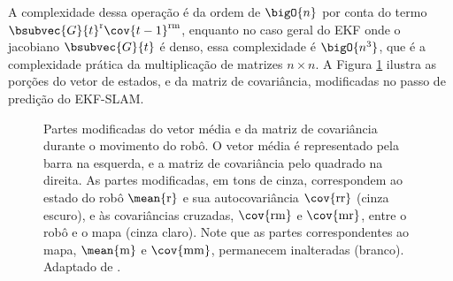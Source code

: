 \renewcommand{\arraystretch}{1.0}
A complexidade dessa operação é da ordem de $\bigO{n}$ por conta do termo $\bsubvec{G}{t}^\mathrm{r} \cov{t-1}^\mathrm{rm}$, enquanto no caso geral do EKF onde o jacobiano $\bsubvec{G}{t}$ é denso, essa complexidade é $\bigO{n^3}$, que é a complexidade prática da multiplicação de matrizes $n \times n$. A Figura 
\ref{fig:ekfslam-prediction} ilustra as porções do vetor de estados, e da 
matriz de covariância, modificadas no passo de predição do EKF-SLAM.

\begin{figure}[h]
  \centering
  
  \caption{Partes modificadas do vetor média e da matriz de covariância durante o movimento do robô. O vetor média é representado pela barra na esquerda, e a matriz de covariância pelo quadrado na direita. As partes modificadas, em tons de cinza, correspondem ao estado do robô $\mean{\mathrm{r}}$  e sua autocovariância $\cov{\mathrm{rr}}$ (cinza escuro), e às covariâncias cruzadas, $\cov{\mathrm{rm}}$ e $\cov{\mathrm{mr}}$, entre o robô e o mapa (cinza claro). Note que as partes correspondentes ao mapa, $\mean{\mathrm{m}}$ e $\cov{\mathrm{mm}}$, 
  permanecem inalteradas (branco). Adaptado de \cite[p.~10]{jsola}.}
  \label{fig:ekfslam-prediction}
\end{figure}


